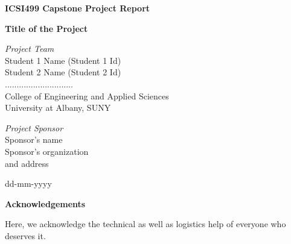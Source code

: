 \documentclass[12pt]{article}
\begin{document}

\begin{titlepage}
	\clearpage\thispagestyle{empty}
	\centering
	\vspace{1.5cm}
   {\normalsize
    \textbf{ICSI499 Capstone Project Report} \par
}
  	\vspace{1.5cm}
	{\Huge \textbf{Title of the Project}} \\
	\vspace{3cm}
	{\normalsize \textit{Project Team}\\
		\vspace{0.25cm}
	Student 1 Name (Student 1 Id)   \\ %
	             Student 2 Name (Student 2 Id) \\
	             ............................. \\
	             College of Engineering and Applied Sciences\\
	             University at Albany, SUNY \par}
	\vspace{4cm}
 
    {\normalsize
    \textit{Project Sponsor}\\
    		\vspace{0.25cm}
    Sponsor's name  \\
    Sponsor's organization \\
    and address \par
}

 
    \vspace{3cm}
		
	{\normalsize dd-mm-yyyy \par}
	
	\pagebreak


\end{titlepage}
	
\clearpage\thispagestyle{empty}

	\vspace{1cm}
		\begin{center}
\textbf{Acknowledgements}\\
		\end{center}
	\vspace{1cm}
{\normalsize Here, we acknowledge the technical as well as logistics help of everyone who deserves it.
\par}
\end{document}
